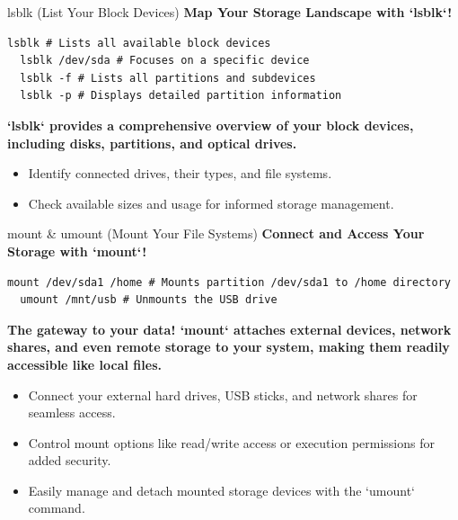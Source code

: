 \documentclass{beamer}
\begin{document}
\begin{frame}[fragile]{lsblk (List Your Block Devices)}
  \textbf{Map Your Storage Landscape with `lsblk`!}

  \begin{lstlisting}[frame=none]
  lsblk # Lists all available block devices
  lsblk /dev/sda # Focuses on a specific device
  lsblk -f # Lists all partitions and subdevices
  lsblk -p # Displays detailed partition information
  \end{lstlisting}

  \textbf{`lsblk` provides a comprehensive overview of your block devices, including disks, partitions, and optical drives.}

  \begin{itemize}
    \item Identify connected drives, their types, and file systems.
    \item Check available sizes and usage for informed storage management.
  \end{itemize}
\end{frame}


\begin{frame}[fragile]{mount \& umount (Mount Your File Systems)}
  \textbf{Connect and Access Your Storage with `mount`!}

  \begin{lstlisting}[frame=none]
  mount /dev/sda1 /home # Mounts partition /dev/sda1 to /home directory
  umount /mnt/usb # Unmounts the USB drive
  \end{lstlisting}

  \textbf{The gateway to your data! `mount` attaches external devices, network shares, and even remote storage to your system, making them readily accessible like local files.}

  \begin{itemize}
    \item Connect your external hard drives, USB sticks, and network shares for seamless access.
    \item Control mount options like read/write access or execution permissions for added security.
    \item Easily manage and detach mounted storage devices with the `umount` command.
  \end{itemize}
\end{frame}
\end{document}
